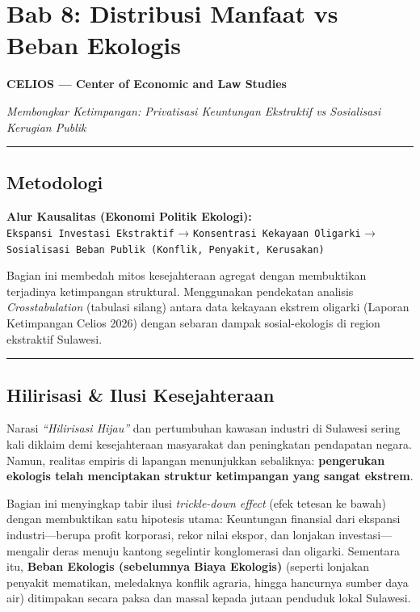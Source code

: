 \documentclass[
]{article}
\author{}
\date{}
\begin{document}
\section{Bab 8: Distribusi Manfaat vs Beban
Ekologis}\label{bab-8-distribusi-manfaat-vs-beban-ekologis}

\textbf{CELIOS --- Center of Economic and Law Studies}

\emph{Membongkar Ketimpangan: Privatisasi Keuntungan Ekstraktif vs
Sosialisasi Kerugian Publik}

\begin{center}\rule{0.5\linewidth}{0.5pt}\end{center}

\subsection{Metodologi}\label{metodologi}

\textbf{Alur Kausalitas (Ekonomi Politik Ekologi):}
\texttt{Ekspansi\ Investasi\ Ekstraktif} →
\texttt{Konsentrasi\ Kekayaan\ Oligarki} →
\texttt{Sosialisasi\ Beban\ Publik\ (Konflik,\ Penyakit,\ Kerusakan)}

Bagian ini membedah mitos kesejahteraan agregat dengan membuktikan
terjadinya ketimpangan struktural. Menggunakan pendekatan analisis
\emph{Crosstabulation} (tabulasi silang) antara data kekayaan ekstrem
oligarki (Laporan Ketimpangan Celios 2026) dengan sebaran dampak
sosial-ekologis di region ekstraktif Sulawesi.

\begin{center}\rule{0.5\linewidth}{0.5pt}\end{center}

\subsection{Hilirisasi \& Ilusi
Kesejahteraan}\label{hilirisasi-ilusi-kesejahteraan}

Narasi \emph{``Hilirisasi Hijau''} dan pertumbuhan kawasan industri di
Sulawesi sering kali diklaim demi kesejahteraan masyarakat dan
peningkatan pendapatan negara. Namun, realitas empiris di lapangan
menunjukkan sebaliknya: \textbf{pengerukan ekologis telah menciptakan
struktur ketimpangan yang sangat ekstrem}.

Bagian ini menyingkap tabir ilusi \emph{trickle-down effect} (efek
tetesan ke bawah) dengan membuktikan satu hipotesis utama: Keuntungan
finansial dari ekspansi industri---berupa profit korporasi, rekor nilai
ekspor, dan lonjakan investasi---mengalir deras menuju kantong
segelintir konglomerasi dan oligarki. Sementara itu, \textbf{Beban
Ekologis (sebelumnya Biaya Ekologis)} (seperti lonjakan penyakit
mematikan, meledaknya konflik agraria, hingga hancurnya sumber daya air)
ditimpakan secara paksa dan massal kepada jutaan penduduk lokal
Sulawesi.
\end{document}

